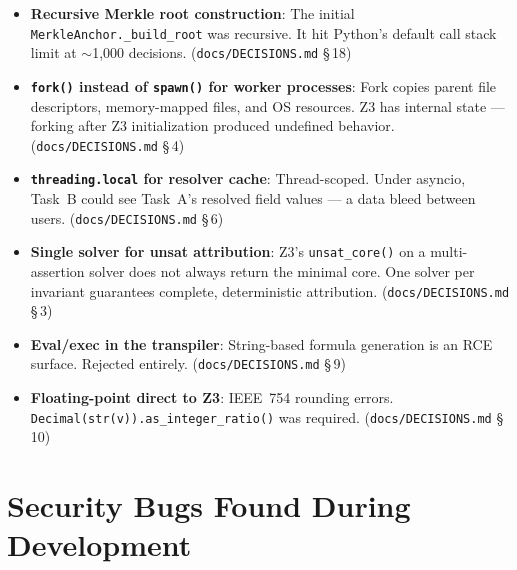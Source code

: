 \documentclass[12pt,a4paper,oneside]{report}
\newcommand{\fname}[1]{\texttt{#1}}          %
\newcommand{\code}[1]{\texttt{#1}}           %
\newcommand{\cfrsec}[1]{\S\,#1}             %
\begin{document}
\begin{itemize}
  \item \textbf{Recursive Merkle root construction}: The initial
        \code{MerkleAnchor.\_build\_root} was recursive. It hit Python's
        default call stack limit at $\sim$1,000 decisions.
        (\fname{docs/DECISIONS.md} \cfrsec{18})

  \item \textbf{\code{fork()} instead of \code{spawn()} for worker processes}:
        Fork copies parent file descriptors, memory-mapped files, and OS
        resources. Z3 has internal state --- forking after Z3 initialization
        produced undefined behavior. (\fname{docs/DECISIONS.md} \cfrsec{4})

  \item \textbf{\code{threading.local} for resolver cache}: Thread-scoped.
        Under asyncio, Task~B could see Task~A's resolved field values --- a
        data bleed between users. (\fname{docs/DECISIONS.md} \cfrsec{6})

  \item \textbf{Single solver for unsat attribution}: Z3's \code{unsat\_core()}
        on a multi-assertion solver does not always return the minimal core.
        One solver per invariant guarantees complete, deterministic attribution.
        (\fname{docs/DECISIONS.md} \cfrsec{3})

  \item \textbf{Eval/exec in the transpiler}: String-based formula generation
        is an RCE surface. Rejected entirely. (\fname{docs/DECISIONS.md}
        \cfrsec{9})

  \item \textbf{Floating-point direct to Z3}: IEEE~754 rounding errors.
        \code{Decimal(str(v)).as\_integer\_ratio()} was required.
        (\fname{docs/DECISIONS.md} \cfrsec{10})
\end{itemize}

\section{Security Bugs Found During Development}
\end{document}
